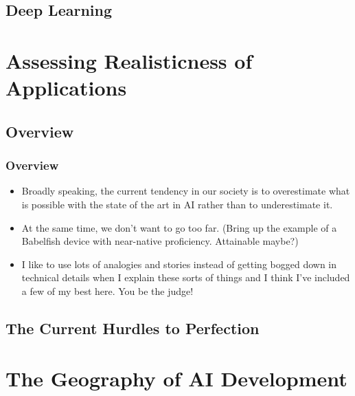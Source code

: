 \documentclass[10pt]{beamer}
\begin{document}

  \subsection{Deep Learning}

  \section{Assessing Realisticness of Applications}

  \subsection{Overview}

  \begin{frame}
    \frametitle{Overview}

    \begin{itemize}
      \item Broadly speaking, the current tendency in our society is to
        overestimate what is possible with the state of the art in AI rather
        than to underestimate it.
      \pause
      \item At the same time, we don't want to go too far. (Bring up the
        example of a Babelfish device with near-native proficiency.
        Attainable maybe?)
      \pause
      \item I like to use lots of analogies and stories instead of getting
        bogged down in technical details when I explain these sorts of things
        and I think I've included a few of my best here. You be the judge!
    \end{itemize}
  \end{frame}

  \subsection{The Current Hurdles to Perfection}


  \section{The Geography of AI Development}
\end{document}
